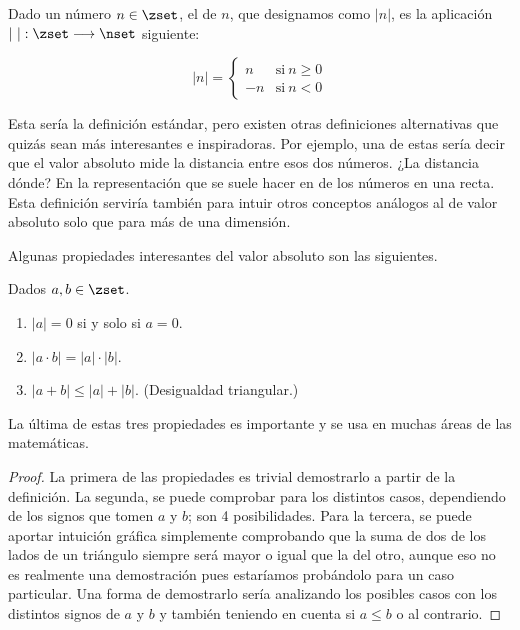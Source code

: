 



\begin{deffinition}
  Dado un número $n \in \zset$, el  de $n$, que designamos
  como $|n|$, es la aplicación $|\ |: \zset \longrightarrow \nset$
  siguiente:

  \begin{equation*}
    |n| =
    \left\{
    \begin{array}{rl}
      n     & \text{si} \ n \geq 0 \\
      {-n}  & \text{si} \ n < 0
    \end{array}
    \right.
  \end{equation*}
\end{deffinition}

Esta sería la definición estándar, pero existen otras definiciones
alternativas que quizás sean más interesantes e inspiradoras. Por ejemplo,
una de estas sería decir que el valor absoluto mide la distancia entre esos
dos números. ¿La distancia dónde? En la representación que se suele hacer en
de los números en una recta. Esta definición serviría también para intuir
otros conceptos análogos al de valor absoluto solo que para más de una
dimensión.

Algunas propiedades interesantes del valor absoluto son las siguientes.

\begin{properties}
  Dados $a, b \in \zset$.

  \begin{enumerate}
    \item $|a| = 0$ si y solo si $a = 0$.
    \item $|a \cdot b| = |a| \cdot |b|$.
    \item $|a + b| \leq |a| + |b|$. (Desigualdad triangular.)
  \end{enumerate}
\end{properties}

La última de estas tres propiedades es importante y se usa en muchas áreas
de las matemáticas.

\begin{proof}
  La primera de las propiedades es trivial demostrarlo a partir de la
  definición. La segunda, se puede comprobar para los distintos casos,
  dependiendo de los signos que tomen $a$ y $b$; son 4 posibilidades. Para
  la tercera, se puede aportar intuición gráfica simplemente comprobando que
  la suma de dos de los lados de un triángulo siempre será mayor o igual que
  la del otro, aunque eso no es realmente una demostración pues estaríamos
  probándolo para un caso particular. Una forma de demostrarlo sería
  analizando los posibles casos con los distintos signos de $a$ y $b$ y
  también teniendo en cuenta si $a \leq b$ o al contrario.
\end{proof}

